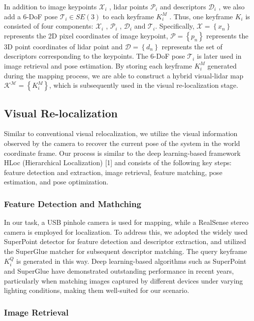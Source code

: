 \documentclass[conference]{./support/ieeeconf}
\begin{document}
In addition to image keypoints $\mathcal{X}_i$ , lidar points  $\mathcal{P}_i$  and descriptors $\mathcal{D}_i$ , we also add  a 6-DoF pose $\mathcal{T}_i \in SE(3)$ to each keyframe $K^M_i$ . Thus, one keyframe ${K}_i$ is consisted of four components: $\mathcal{X}_i$ , $\mathcal{P}_i$ , $\mathcal{D}_i$ and $\mathcal{T}_i$. Specifically, $\mathcal{X} = \left\{ x_n \right\}$ represents the 2D pixel coordinates of image keypoint, $\mathcal{P} = \left\{ p_n \right\}$ represents the 3D point coordinates of lidar point and $\mathcal{D} = \left\{ d_n \right\}$ represents the set of descriptors corresponding to the keypoints. The 6-DoF pose $\mathcal{T}_i$ is later used in image retrieval and pose estimation. By storing each keyframe $K^M_i$ generated during the mapping process, we are able to construct a hybrid visual-lidar map $\mathcal{K^M} = \left\{ K^M_i \right\} $, which is subsequently used in the visual re-localization stage.

\subsection{Visual Re-localization}
Similar to conventional visual relocalization, we utilize the visual information observed by the camera to recover the current  pose of the system in the world coordinate frame. Our process is similar to the deep learning-based framework HLoc (Hierarchical Localization) [1] and consists of the following key steps: feature detection and extraction, image retrieval, feature matching, pose estimation, and pose optimization.

\subsubsection{Feature Detection and Mathching}
In our task, a USB pinhole camera is used for mapping, while a RealSense stereo camera is employed for localization. To address this, we adopted the widely used SuperPoint detector for feature detection and descriptor extraction, and utilized the SuperGlue matcher for subsequent descriptor matching. The query keyframe $K^Q_i$  is generated in this way. Deep learning-based algorithms such as SuperPoint and SuperGlue have demonstrated outstanding performance in recent years, particularly when matching images captured by different devices under varying lighting conditions, making them well-suited for our scenario.

\subsubsection{Image Retrieval}
\end{document}
